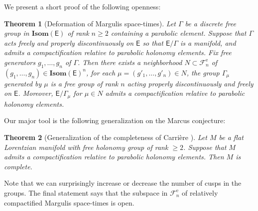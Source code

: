 \documentclass{amsart}
\numberwithin{equation}{section}
\newcommand\eps{\epsilon}
\newcommand\Isom{{\mathbf{Isom}}}
\newcommand\Lspace{\mathsf E}
\newtheorem{theorem}{Theorem}[section]
\theoremstyle{definition}
\theoremstyle{remark}
\newcommand{\rome}{\mathrm e}
\begin{document}
We present a short proof of the following openness: 

\begin{theorem}[Deformation of Margulis space-times] \label{thm:main} 
Let $\Gamma$ be a discrete free group in $\Isom(\Lspace)$ of rank $n \geq 2$ containing a parabolic element. 
Suppose that $\Gamma$ acts freely and 
properly discontinuously on $\Lspace$ so that 
$\Lspace/\Gamma$ is a manifold, and admits a compactification 
relative to parabolic holonomy elements.
Fix free generators $g_1,\dots, g_n$ of $\Gamma$.
Then 
there exists a neighborhood $N \subset \mathcal{F}^{\rome}_n$ 
of $(g_1, \dots, g_n) \in \Isom(\Lspace)^n$, 
for each $\mu=(g'_1, \dots, g'_n)\in N$, 
the group $\Gamma_\mu$ 
generated by $\mu$
is a free group of rank $n$ acting properly discontinuously and freely on $\Lspace$. 
Moreover, $\Lspace/\Gamma_\mu$ for $\mu \in N$ 
admits a compactification relative to parabolic holonomy elements. 
\end{theorem} 


Our major tool is the following generalization on the Marcus conjecture:
\begin{theorem}[Generalization of the completeness of Carri\`ere \cite{Carr89}]\label{thm:Carriere} 
Let $M$ be a flat Lorentzian manifold with free holonomy group of rank $\geq 2$. 
Suppose that $M$ admits a compactification relative to parabolic holonomy elements. 
Then $M$ is complete. 
\end{theorem} 


Note that we can surprisingly increase or decrease the number of cusps in the groups.
The final statement says that the subspace in $\mathcal{F}^{\rome}_n$ 
of relatively compactified Margulis space-times is open.
\end{document}
